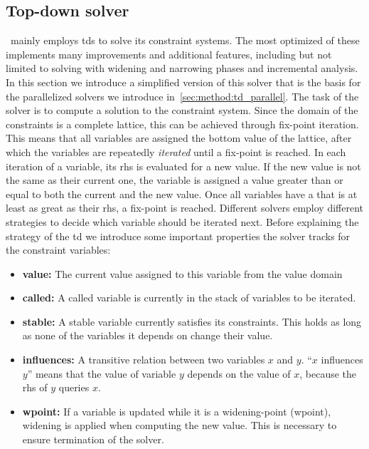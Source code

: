   \subsection{Top-down solver}
  \label{sec:background:td}
  \gob\ mainly employs \acp{td} to solve its constraint systems. The most optimized of these implements many improvements and additional features, including but not limited to solving with widening and narrowing phases and incremental analysis. 
  In this section we introduce a simplified version of this solver that is the basis for the parallelized solvers we introduce in~\autoref{sec:method:td_parallel}.
  The task of the solver is to compute a solution to the constraint system. Since the domain of the constraints is a complete lattice, this can be achieved through fix-point iteration. This means that all variables are assigned the bottom value of the lattice, after which the variables are repeatedly \textit{iterated} until a fix-point is reached. In each iteration of a variable, its \ac{rhs} is evaluated for a new value. If the new value is not the same as their current one, the variable is assigned a value greater than or equal to both the current and the new value. Once all variables have a that is at least as great as their \ac{rhs}, a fix-point is reached.
  Different solvers employ different strategies to decide which variable should be iterated next. Before explaining the strategy of the \ac{td} we introduce some important properties the solver tracks for the constraint variables:
  \begin{itemize}[leftmargin=*]
    \item \textbf{value:} The current value assigned to this variable from the value domain
    \item \textbf{called:} A called variable is currently in the stack of variables to be iterated.
    \item \textbf{stable:} A stable variable currently satisfies its constraints. This holds as long as none of the variables it depends on change their value.
    \item \textbf{influences:} A transitive relation between two variables $x$ and $y$. ``$x$ influences $y$'' means that the value of variable $y$ depends on the value of $x$, because the \ac{rhs} of $y$ queries $x$.
    \item \textbf{wpoint:} If a variable is updated while it is a widening-point (wpoint), widening is applied when computing the new value. This is necessary to ensure termination of the solver.
  \end{itemize}
